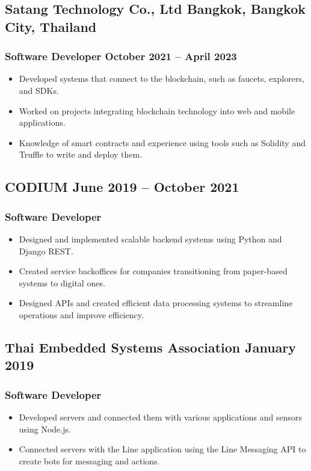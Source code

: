 \documentclass[a4paper,10pt]{article}
\begin{document}
\subsection*{Satang Technology Co., Ltd \hfill Bangkok, Bangkok City, Thailand}
\subsubsection*{Software Developer \hfill October 2021 – April 2023}
\begin{itemize}[leftmargin=1.5em]
    \item Developed systems that connect to the blockchain, such as faucets, explorers, and SDKs.
    \item Worked on projects integrating blockchain technology into web and mobile applications.
    \item Knowledge of smart contracts and experience using tools such as Solidity and Truffle to write and deploy them.
\end{itemize}

\subsection*{CODIUM \hfill June 2019 – October 2021}
\subsubsection*{Software Developer}
\begin{itemize}[leftmargin=1.5em]
    \item Designed and implemented scalable backend systems using Python and Django REST.
    \item Created service backoffices for companies transitioning from paper-based systems to digital ones.
    \item Designed APIs and created efficient data processing systems to streamline operations and improve efficiency.
\end{itemize}

\subsection*{Thai Embedded Systems Association \hfill January 2019}
\subsubsection*{Software Developer}
\begin{itemize}[leftmargin=1.5em]
    \item Developed servers and connected them with various applications and sensors using Node.js.
    \item Connected servers with the Line application using the Line Messaging API to create bots for messaging and actions.
\end{itemize}
\end{document}
